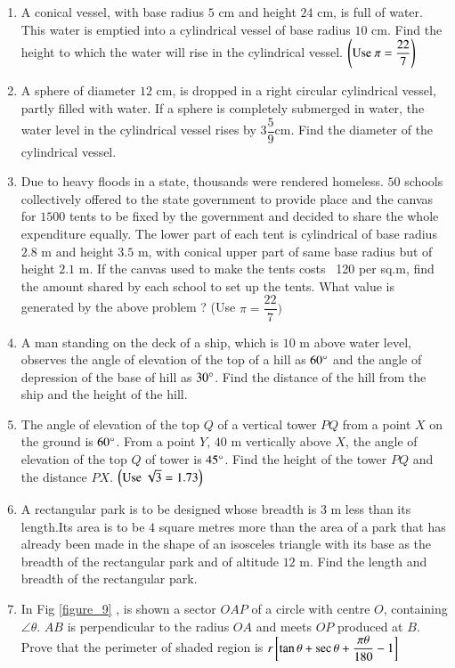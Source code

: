 \begin{enumerate}
\item  A conical vessel, with base radius $5$ cm and height $24$ cm, is full of water. This water is emptied into a cylindrical vessel of base radius $10$ cm. Find the height to which the water will rise in the cylindrical vessel. $\left(\text{Use } \pi  = \dfrac{22}{7}\right)$\\
\item  A sphere of diameter $12$ cm, is dropped in a right circular cylindrical vessel, partly filled with water. If a sphere is completely submerged in water, the water level in the cylindrical vessel rises by $ 3 \dfrac{5}{9}$cm. Find the diameter of the cylindrical vessel.\\  
\item  Due to heavy floods in a state, thousands were rendered homeless. $50$ schools collectively offered to the state government to provide place and the canvas for $1500$ tents to be fixed by the government and decided to share the whole expenditure equally. The lower part of each tent is cylindrical of base radius $2.8$ m and height $3.5$ m, with conical upper part of same base radius but of height $2.1$ m. If the canvas used to make the tents costs \rupee~120 per sq.m, find the amount shared by each school to set up the tents. What value is generated by the above problem ? (Use $ \pi = \dfrac{22}{7} ) $\\
\item  A man standing on the deck of a ship, which is $10$ m above water level, observes the angle of elevation of the top of a hill as $ 60\degree $ and the angle of depression of the base of hill as $ 30 \degree $. Find the distance of the hill from the ship and the height of the hill.\\
\item The angle of elevation of the top $Q$ of a vertical tower $PQ$ from a point $X$ on the ground is $ 60\degree $. From a point $Y$, $40$ m vertically above $X$, the angle of elevation of the top $Q$ of tower is $ 45 \degree $. Find the height of the tower $PQ$ and the distance $PX$. $\left(\text{Use }\sqrt{3} = 1.73\right)$\\
\item A rectangular park is to be designed whose breadth is $3$ m less than its length.Its area is to be $4$ square metres more than the area of a park that has already been made in the shape of an isosceles triangle with its base as the breadth of the rectangular park and of altitude $12$ m. Find the length and breadth of the rectangular park.\\
\item In Fig  \ref{figure_9} , is shown a sector $OAP$ of a circle with centre $O$, containing $\angle \theta$. $AB$ is perpendicular to the radius $OA$ and meets $OP$ produced at $B$. Prove that the perimeter of shaded region is $r{}\left[\tan \theta + \sec \theta + \dfrac{\pi \theta}{180}-1\right]$ \\


\end{enumerate}
